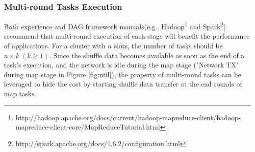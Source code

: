 \subsubsection{Multi-round Tasks Execution}\label{multi}
Both experience and DAG framework manuals(e.g., Hadoop\footnote{http://hadoop.apache.org/docs/current/hadoop-mapreduce-client/hadoop-mapreduce-client-core/MapReduceTutorial.html} and Spark\footnote{http://spark.apache.org/docs/1.6.2/configuration.html}) recommend that multi-round execution of each stage will benefit the performance of applications.
For a cluster with $n$ slots, the number of tasks should be $n \times k \; (k \geq 1)$. 
Since the shuffle data becomes available as soon as the end of a task's execution, 
and the network is idle during the map stage ("Network TX" during map stage in Figure \ref{fig:util}), 
the property of multi-round tasks can be leveraged to hide the cost by starting shuffle data transfer at the end rounds of map tasks. 

